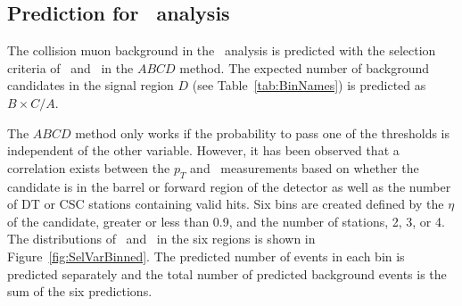 \subsection{Prediction for \muononly\ analysis \label{sec:MuOnlyPred}}

The collision muon  background in the \muononly\ analysis is predicted with the selection criteria of \invbeta\ and \pt\ in the $ABCD$  method.
The expected number of background candidates in the signal region $D$ (see Table~\ref{tab:BinNames}) is predicted as $B \times C / A$. 

The $ABCD$ method only works if the probability to pass one of the thresholds is independent of the other variable.
However, it has been observed that a correlation exists between the $p_T$ and \invbeta\ measurements based on whether the candidate is in the barrel or forward
region of the detector as well as the number of DT or CSC stations containing valid hits. 
Six bins are created defined by the $\eta$ of the candidate, greater or less than 0.9, and the number of stations, 2, 3, or 4.
The distributions of \pt\ and \invbeta\ in the six regions is shown in Figure~\ref{fig:SelVarBinned}.
The predicted number of events in each bin is predicted separately and the total number of predicted background events is the sum of the six predictions.

